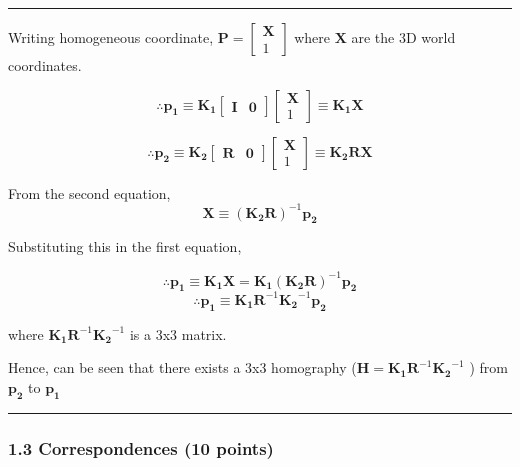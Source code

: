 \documentclass[11pt]{article}
\begin{document}
    \begin{center}\rule{0.5\linewidth}{0.5pt}\end{center}

Writing homogeneous coordinate,
\(\mathbf{P} = \begin{bmatrix} \mathbf{X} \\ 1\end{bmatrix}\) where
\(\mathbf{X}\) are the 3D world coordinates.

\[\therefore \mathbf{p_1} \equiv \mathbf{K_1} \begin{bmatrix} \mathbf{I} & \mathbf{0} \end{bmatrix}\begin{bmatrix} \mathbf{X} \\ 1\end{bmatrix} \equiv \mathbf{K_1}\mathbf{X}\]

\[\therefore \mathbf{p_2} \equiv \mathbf{K_2} \begin{bmatrix} \mathbf{R} & \mathbf{0} \end{bmatrix}\begin{bmatrix} \mathbf{X} \\ 1\end{bmatrix} \equiv \mathbf{K_2}\mathbf{R}\mathbf{X}\]

From the second equation,
\[\mathbf{X} \equiv (\mathbf{K_2}\mathbf{R})^{-1}\mathbf{p_2}\]

Substituting this in the first equation,

\[\therefore \mathbf{p_1} \equiv \mathbf{K_1}\mathbf{X} = \mathbf{K_1}(\mathbf{K_2}\mathbf{R})^{-1}\mathbf{p_2}\]
\[\therefore \mathbf{p_1} \equiv \mathbf{K_1}\mathbf{R}^{-1}\mathbf{K_2}^{-1}\mathbf{p_2}\]

where \(\mathbf{K_1}\mathbf{R}^{-1}\mathbf{K_2}^{-1}\) is a 3x3 matrix.

Hence, can be seen that there exists a 3x3 homography
(\(\mathbf{H} = \mathbf{K_1}\mathbf{R}^{-1}\mathbf{K_2}^{-1}\) ) from
\(\mathbf{p_2}\) to \(\mathbf{p_1}\)

\begin{center}\rule{0.5\linewidth}{0.5pt}\end{center}

    \hypertarget{correspondences-10-points}{%
\subsubsection{1.3 Correspondences (10
points)}\label{correspondences-10-points}}
\end{document}
